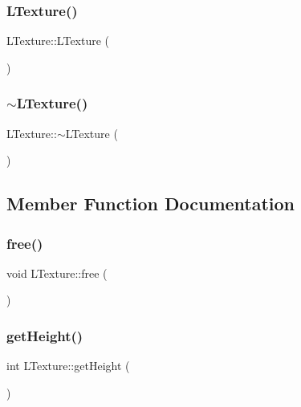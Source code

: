 \subsubsection{\texorpdfstring{L\+Texture()}{LTexture()}}
{\footnotesize\ttfamily L\+Texture\+::\+L\+Texture (\begin{DoxyParamCaption}{ }\end{DoxyParamCaption})}

\mbox{\label{class_l_texture_a49cfe57c36e58ad99c1ea73fc274b77b}} 
\subsubsection{\texorpdfstring{$\sim$\+L\+Texture()}{~LTexture()}}
{\footnotesize\ttfamily L\+Texture\+::$\sim$\+L\+Texture (\begin{DoxyParamCaption}{ }\end{DoxyParamCaption})}



\subsection{Member Function Documentation}
\mbox{\label{class_l_texture_abef558f0b920270079925548a3976a06}} 
\subsubsection{\texorpdfstring{free()}{free()}}
{\footnotesize\ttfamily void L\+Texture\+::free (\begin{DoxyParamCaption}{ }\end{DoxyParamCaption})}

\mbox{\label{class_l_texture_a277f45af3dae7e35ca846a527039e59a}} 
\subsubsection{\texorpdfstring{get\+Height()}{getHeight()}}
{\footnotesize\ttfamily int L\+Texture\+::get\+Height (\begin{DoxyParamCaption}{ }\end{DoxyParamCaption})}

